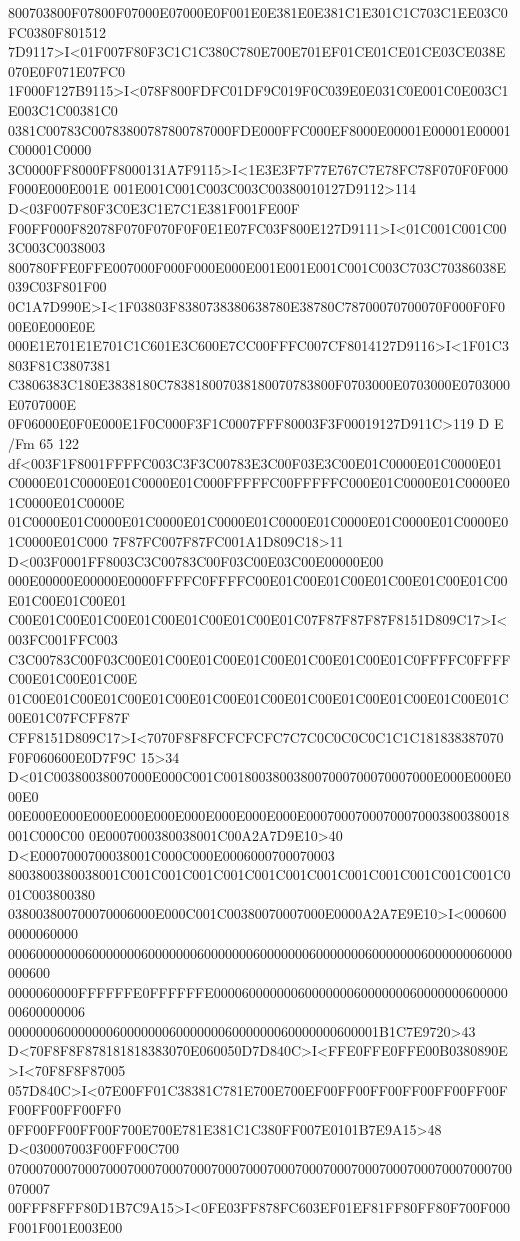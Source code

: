 800703800F07800F07000E07000E0F001E0E381E0E381C1E301C1C703C1EE03C0FC0380F801512
7D9117>I<01F007F80F3C1C1C380C780E700E701EF01CE01CE01CE03CE038E070E0F071E07FC0
1F000F127B9115>I<078F800FDFC01DF9C019F0C039E0E031C0E001C0E003C1E003C1C00381C0
0381C00783C00783800787800787000FDE000FFC000EF8000E00001E00001E00001C00001C0000
3C0000FF8000FF8000131A7F9115>I<1E3E3F7F77E767C7E78FC78F070F0F000F000E000E001E
001E001C001C003C003C00380010127D9112>114 D<03F007F80F3C0E3C1E7C1E381F001FE00F
F00FF000F82078F070F070F0F0E1E07FC03F800E127D9111>I<01C001C001C003C003C0038003
800780FFE0FFE007000F000F000E000E001E001E001C001C003C703C70386038E039C03F801F00
0C1A7D990E>I<1F03803F8380738380638780E38780C78700070700070F000F0F000E0E000E0E
000E1E701E1E701C1C601E3C600E7CC00FFFC007CF8014127D9116>I<1F01C3803F81C3807381
C3806383C180E3838180C783818007038180070783800F0703000E0703000E0703000E0707000E
0F06000E0F0E000E1F0C000F3F1C0007FFF80003F3F00019127D911C>119
D E /Fm 65 122 df<003F1F8001FFFFC003C3F3C00783E3C00F03E3C00E01C0000E01C0000E01
C0000E01C0000E01C0000E01C000FFFFFC00FFFFFC000E01C0000E01C0000E01C0000E01C0000E
01C0000E01C0000E01C0000E01C0000E01C0000E01C0000E01C0000E01C0000E01C0000E01C000
7F87FC007F87FC001A1D809C18>11 D<003F0001FF8003C3C00783C00F03C00E03C00E00000E00
000E00000E00000E0000FFFFC0FFFFC00E01C00E01C00E01C00E01C00E01C00E01C00E01C00E01
C00E01C00E01C00E01C00E01C00E01C00E01C07F87F87F87F8151D809C17>I<003FC001FFC003
C3C00783C00F03C00E01C00E01C00E01C00E01C00E01C00E01C0FFFFC0FFFFC00E01C00E01C00E
01C00E01C00E01C00E01C00E01C00E01C00E01C00E01C00E01C00E01C00E01C00E01C07FCFF87F
CFF8151D809C17>I<7070F8F8FCFCFCFC7C7C0C0C0C0C1C1C181838387070F0F060600E0D7F9C
15>34 D<01C00380038007000E000C001C001800380038007000700070007000E000E000E000E0
00E000E000E000E000E000E000E000E000E000E00070007000700070003800380018001C000C00
0E0007000380038001C00A2A7D9E10>40 D<E0007000700038001C000C000E0006000700070003
8003800380038001C001C001C001C001C001C001C001C001C001C001C001C001C001C003800380
038003800700070006000E000C001C00380070007000E0000A2A7E9E10>I<0006000000060000
000600000006000000060000000600000006000000060000000600000006000000060000000600
0000060000FFFFFFE0FFFFFFE00006000000060000000600000006000000060000000600000006
00000006000000060000000600000006000000060000000600001B1C7E9720>43
D<70F8F8F878181818383070E060050D7D840C>I<FFE0FFE0FFE00B0380890E>I<70F8F8F87005
057D840C>I<07E00FF01C38381C781E700E700EF00FF00FF00FF00FF00FF00FF00FF00FF00FF0
0FF00FF00FF00F700E700E781E381C1C380FF007E0101B7E9A15>48 D<030007003F00FF00C700
070007000700070007000700070007000700070007000700070007000700070007000700070007
00FFF8FFF80D1B7C9A15>I<0FE03FF878FC603EF01EF81FF80FF80F700F000F001F001E003E00
